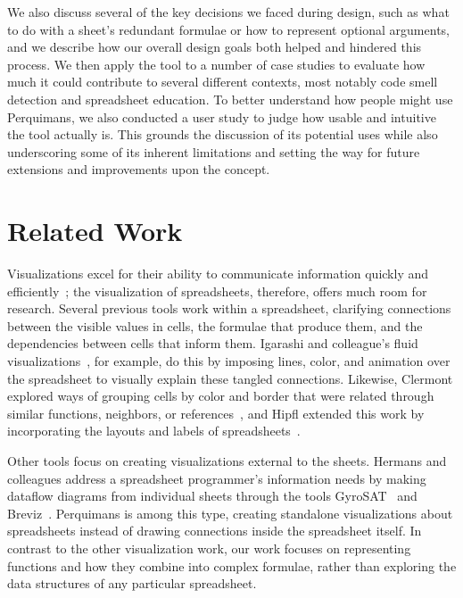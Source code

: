 \documentclass[conference]{IEEEtran}
\newcommand{\toolname}{Perquimans\xspace} \newcommand{\toolnameend}{Perquimans}
\begin{document}
	We also discuss several of the key decisions we faced during design, such as
	what to do with a sheet's redundant formulae or how to represent optional
	arguments, and we describe how our overall design goals both helped and
	hindered this process. We then apply the tool to a number of case studies to
	evaluate how much it could contribute to several different contexts, most
	notably code smell detection and spreadsheet education. To better understand
	how people might use \toolnameend, we also conducted a user study to judge how
	usable and intuitive the tool actually is. This grounds the discussion of its
	potential uses while also underscoring some of its inherent limitations and
	setting the way for future extensions and improvements upon the concept.
	
	\section{Related Work} \label{related-work} Visualizations excel for their
	ability to communicate information quickly and
	efficiently~\cite{baeza1999modern}; the visualization of spreadsheets,
	therefore, offers much room for research. Several previous tools work
	within a spreadsheet, clarifying connections between the visible
	values in cells, the formulae that produce them, and the dependencies between
	cells that inform them. Igarashi and colleague's fluid
	visualizations~\cite{igarashi1998fluid}, for example, do this by imposing
	lines, color, and animation over the spreadsheet to visually explain these
	tangled connections. Likewise, Clermont explored ways of grouping cells by
	color and border that were related through similar functions, neighbors, or
	references~\cite{clermont2003scalable}, and Hipfl extended this work by
	incorporating the layouts and labels of spreadsheets~\cite{hipfl2008using}.
	
	Other tools focus on creating visualizations external to the sheets. Hermans
	and colleagues address a spreadsheet programmer's information needs by making
	dataflow diagrams from individual sheets through the tools
	GyroSAT~\cite{hermans2011supporting} and Breviz~\cite{hermans2011breviz}.
	\toolname is among this type, creating standalone visualizations about
	spreadsheets instead of drawing connections inside the spreadsheet itself. In
	contrast to the other visualization work, our work focuses on representing
	functions and how they combine into complex formulae, rather than exploring the
	data structures of any particular spreadsheet. 
	
\end{document}
